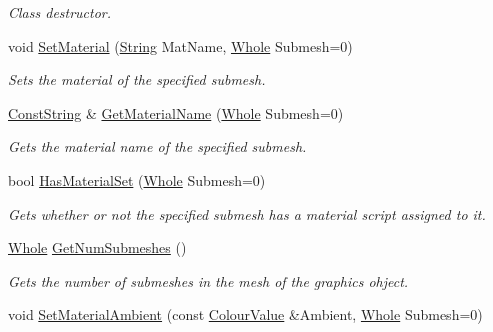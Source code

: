 \begin{DoxyCompactItemize}
\begin{DoxyCompactList}\small\item\em Class destructor. \item\end{DoxyCompactList}\item 
void \hyperlink{classphys_1_1ActorGraphicsSettings_a8954153fe516ddf4e0107348c3af5abc}{SetMaterial} (\hyperlink{namespacephys_aa03900411993de7fbfec4789bc1d392e}{String} MatName, \hyperlink{namespacephys_a460f6bc24c8dd347b05e0366ae34f34a}{Whole} Submesh=0)
\begin{DoxyCompactList}\small\item\em Sets the material of the specified submesh. \item\end{DoxyCompactList}\item 
\hyperlink{namespacephys_a5ce5049f8b4bf88d6413c47b504ebb31}{ConstString} \& \hyperlink{classphys_1_1ActorGraphicsSettings_ab0c7beb46db48e20f42d50516b826a86}{GetMaterialName} (\hyperlink{namespacephys_a460f6bc24c8dd347b05e0366ae34f34a}{Whole} Submesh=0)
\begin{DoxyCompactList}\small\item\em Gets the material name of the specified submesh. \item\end{DoxyCompactList}\item 
bool \hyperlink{classphys_1_1ActorGraphicsSettings_a7b1948300461014e30e8a295917ae886}{HasMaterialSet} (\hyperlink{namespacephys_a460f6bc24c8dd347b05e0366ae34f34a}{Whole} Submesh=0)
\begin{DoxyCompactList}\small\item\em Gets whether or not the specified submesh has a material script assigned to it. \item\end{DoxyCompactList}\item 
\hyperlink{namespacephys_a460f6bc24c8dd347b05e0366ae34f34a}{Whole} \hyperlink{classphys_1_1ActorGraphicsSettings_af959c11c0de5b62d217201731163ee8d}{GetNumSubmeshes} ()
\begin{DoxyCompactList}\small\item\em Gets the number of submeshes in the mesh of the graphics ohject. \item\end{DoxyCompactList}\item 
void \hyperlink{classphys_1_1ActorGraphicsSettings_a93d1c9b229b51b98702b29b8bb5ec4d0}{SetMaterialAmbient} (const \hyperlink{classphys_1_1ColourValue}{ColourValue} \&Ambient, \hyperlink{namespacephys_a460f6bc24c8dd347b05e0366ae34f34a}{Whole} Submesh=0)

\end{DoxyCompactItemize}

